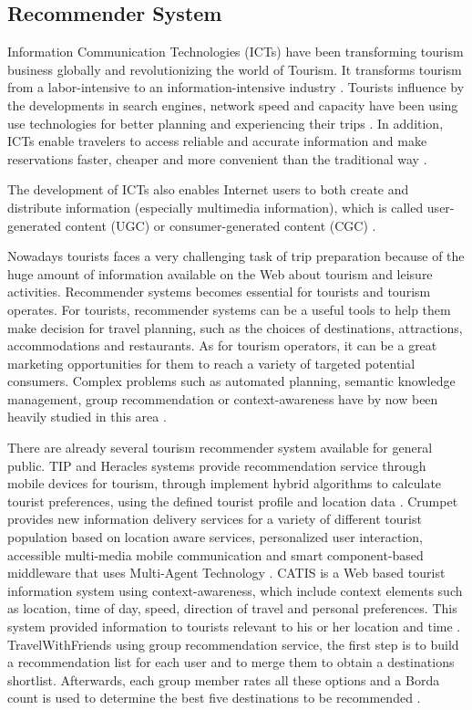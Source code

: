 \subsection{Recommender System}
Information Communication Technologies (ICTs) have been transforming tourism business
globally and revolutionizing the world of Tourism. It transforms tourism from a
labor-intensive to an information-intensive industry \cite{Williams201787}.
Tourists influence by the developments in search engines, network speed and capacity 
have been using use technologies for better planning and experiencing their
trips \cite{XIE2017101}. In addition, ICTs enable travelers to access reliable and
accurate information and make reservations faster, cheaper and more convenient than
the traditional way \cite{chung2009}.

The development of ICTs also enables Internet users to both create and distribute
information (especially multimedia information), which is called user-generated 
content (UGC) or consumer-generated content (CGC) \cite{chung2009}.

Nowadays tourists faces a very challenging task of trip preparation because of the
huge amount of information available on the Web about tourism and leisure activities.
Recommender systems becomes essential for tourists and tourism operates. For tourists,
recommender systems can be a useful tools to help them make decision for travel
planning, such as the choices of destinations, attractions, accommodations and
restaurants. As for tourism operators, it can be a great marketing opportunities for
them to reach a variety of targeted potential consumers. Complex problems such as
automated planning, semantic knowledge management, group recommendation or
context-awareness have by now been heavily studied in this area \cite{morenorecommender}. 

There are already several tourism recommender system available for general public. TIP and Heracles systems provide recommendation service through mobile devices for tourism, through implement hybrid algorithms to calculate tourist preferences, using the defined tourist profile and location data \cite{morenorecommender}. Crumpet provides new information delivery services for a variety of different tourist population based on location aware services, personalized user interaction, accessible multi-media mobile communication and smart component-based middleware that uses Multi-Agent Technology \cite{Santos2018}. CATIS is a Web based tourist information system using context-awareness, which include context elements such as location, time of day, speed, direction of travel and personal preferences. This system provided information to tourists relevant to his or her location and time \cite{Santos2018}. TravelWithFriends using group recommendation service, the first step is to build a recommendation list for each user and to merge them to obtain a destinations shortlist. Afterwards, each group member rates all these options and a Borda count is used to determine the best five destinations to be recommended \cite{morenorecommender}.

